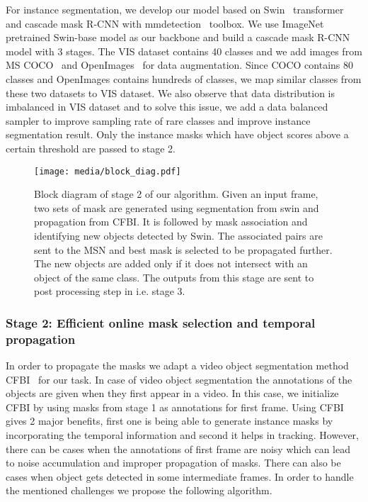 \documentclass[final]{cvpr}
\begin{document}
 For instance segmentation, we develop our model based on Swin~\cite{liu2021swin} transformer and cascade mask R-CNN with mmdetection~\cite{chen2019mmdetection} toolbox. We use ImageNet~\cite{krizhevsky2012imagenet} pretrained Swin-base model as our backbone and build a cascade mask R-CNN model with 3 stages. The VIS dataset contains 40 classes and we add images from MS COCO~\cite{lin2014microsoft} and OpenImages~\cite{kuznetsova2020open} for data augmentation. Since COCO contains 80 classes and OpenImages contains hundreds of classes, we map similar classes from these two datasets to VIS dataset. We also observe that data distribution is imbalanced in VIS dataset and to solve this issue, we add a data balanced sampler to improve sampling rate of rare classes and improve instance segmentation result. Only the instance masks which have object scores above a certain threshold are passed to stage 2.
 
 \begin{figure*}
\begin{center}
\texttt{[image: media/block\_diag.pdf]}
\end{center}

   \caption{Block diagram of stage 2 of our algorithm. Given an input frame, two sets of mask are generated using segmentation from swin and propagation from CFBI. It is followed by mask association and identifying new objects detected by Swin. The associated pairs are sent to the MSN and best mask is selected to be propagated further. The new objects are added only if it does not intersect with an object of the same class. The outputs from this stage are sent to post processing step in i.e. stage 3.}
\label{fig:block}
\end{figure*}


\subsubsection*{Stage 2: Efficient online mask selection and temporal propagation}

In order to propagate the masks we adapt a video object segmentation method CFBI~\cite{yang2020collaborative} for our task. In case of video object segmentation the annotations of the objects are given when they first appear in a video. In this case, we initialize CFBI by using masks from stage 1 as annotations for first frame. Using CFBI gives 2 major benefits, first one is being able to generate instance masks by incorporating the temporal information and second it helps in tracking. However, there can be cases when the annotations of first frame are noisy which can lead to noise accumulation and improper propagation of masks. There can also be cases when object gets detected in some intermediate frames. In order to handle the mentioned challenges
we propose the following algorithm.
\end{document}
